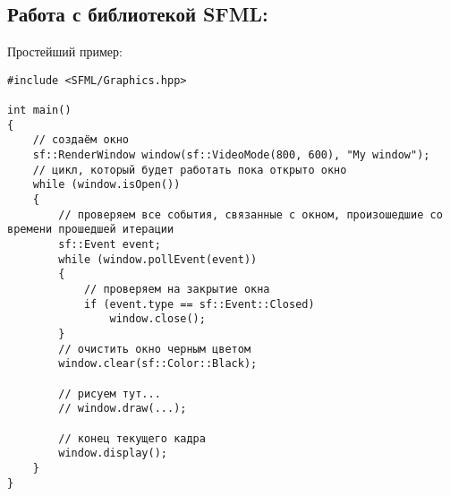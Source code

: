 \documentclass{article}
\begin{document}
\subsection*{Работа с библиотекой SFML:}
Простейший пример:
\begin{lstlisting}
#include <SFML/Graphics.hpp>

int main()
{
    // создаём окно
    sf::RenderWindow window(sf::VideoMode(800, 600), "My window");
    // цикл, который будет работать пока открыто окно
    while (window.isOpen())
    {
        // проверяем все события, связанные с окном, произошедшие со времени прошедшей итерации
        sf::Event event;
        while (window.pollEvent(event))
        {
            // проверяем на закрытие окна
            if (event.type == sf::Event::Closed)
                window.close();
        }
        // очистить окно черным цветом
        window.clear(sf::Color::Black);

        // рисуем тут...
        // window.draw(...);

        // конец текущего кадра
        window.display();
    }
}
\end{lstlisting}
\end{document}
